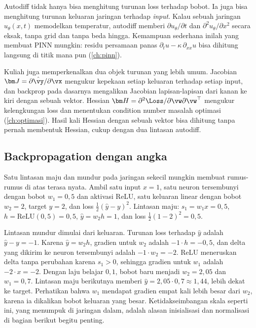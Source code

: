Autodiff tidak hanya bisa menghitung turunan loss terhadap bobot. Ia juga bisa menghitung
turunan keluaran jaringan terhadap \emph{input}. Kalau sebuah jaringan $u_\theta(x,t)$ memodelkan
temperatur, autodiff memberi $\partial u_\theta/\partial t$ dan $\partial^2u_\theta/\partial x^2$
secara eksak, tanpa grid dan tanpa beda hingga. Kemampuan sederhana inilah yang membuat PINN
mungkin: residu persamaan panas $\partial_tu-\kappa\,\partial_{xx}u$ bisa dihitung langsung di titik
mana pun (\cref{ch:pinn}).

Kuliah juga memperkenalkan dua objek turunan yang lebih umum. Jacobian
$\bm J=\partial\hat{\vy}/\partial\vx$ mengukur kepekaan setiap keluaran terhadap setiap input, dan
backprop pada dasarnya mengalikan Jacobian lapisan-lapisan dari kanan ke kiri dengan sebuah
vektor. Hessian $\bm H=\partial^2\Loss/\partial\vw\partial\vw^\top$ mengukur kelengkungan loss
dan menentukan condition number masalah optimasi (\cref{ch:optimasi}). Hasil kali Hessian dengan
sebuah vektor bisa dihitung tanpa pernah membentuk Hessian, cukup dengan dua lintasan autodiff.

\subsection{Backpropagation dengan angka}

Satu lintasan maju dan mundur pada jaringan sekecil mungkin membuat rumus-rumus di atas terasa nyata. Ambil satu input
$x=1$, satu neuron tersembunyi dengan bobot $w_1=0{,}5$ dan aktivasi ReLU, satu keluaran linear dengan bobot $w_2=2$, target
$y=2$, dan loss $\tfrac12(\hat y-y)^2$. Lintasan maju: $s_1=w_1x=0{,}5$, $h=\mathrm{ReLU}(0{,}5)=0{,}5$, $\hat y=w_2h=1$, dan
loss $\tfrac12(1-2)^2=0{,}5$.

Lintasan mundur dimulai dari keluaran. Turunan loss terhadap $\hat y$ adalah $\hat y-y=-1$. Karena $\hat y=w_2h$, gradien
untuk $w_2$ adalah $-1\cdot h=-0{,}5$, dan delta yang dikirim ke neuron tersembunyi adalah $-1\cdot w_2=-2$. ReLU meneruskan
delta tanpa perubahan karena $s_1>0$, sehingga gradien untuk $w_1$ adalah $-2\cdot x=-2$. Dengan laju belajar $0{,}1$, bobot
baru menjadi $w_2=2{,}05$ dan $w_1=0{,}7$. Lintasan maju berikutnya memberi $\hat y=2{,}05\cdot0{,}7\approx1{,}44$, lebih dekat ke
target. Perhatikan bahwa $w_1$ mendapat gradien empat kali lebih besar dari $w_2$, karena ia dikalikan bobot keluaran yang
besar. Ketidakseimbangan skala seperti ini, yang menumpuk di jaringan dalam, adalah alasan inisialisasi dan normalisasi
di bagian berikut begitu penting.


